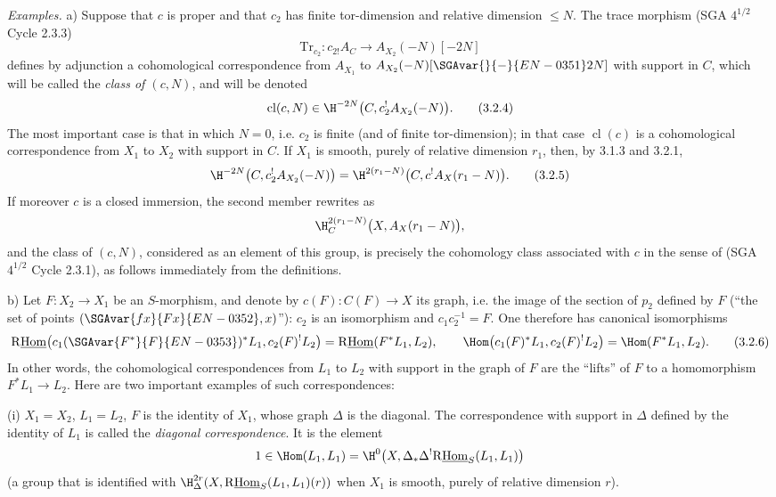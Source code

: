 \emph{Examples.} a) Suppose that $c$ is proper and that $c_2$ has finite tor-dimension and relative dimension $\leq N$. The trace morphism (SGA $4^{1/2}$ Cycle 2.3.3)
\[
\mathrm{Tr}_{c_2}:c_{2!}A_C\longrightarrow A_{X_2}(-N)[-2N]
\]
defines by adjunction a cohomological correspondence from $A_{X_1}$ to $A_{X_2}(-N)[\SGAvar{}{-}{EN-0351}2N]$ with support in $C$, which will be called the \emph{class of $(c,N)$}, and will be denoted
\begin{equation}
\operatorname{cl}(c,N)\in \H^{-2N}\bigl(C,c_2^!A_{X_2}(-N)\bigr).
\tag{3.2.4}
\end{equation}
The most important case is that in which $N=0$, i.e. $c_2$ is finite (and of finite tor-dimension); in that case $\operatorname{cl}(c)$ is a cohomological correspondence from $X_1$ to $X_2$ with support in $C$. If $X_1$ is smooth, purely of relative dimension $r_1$, then, by 3.1.3 and 3.2.1,
\begin{equation}
\H^{-2N}\bigl(C,c_2^!A_{X_2}(-N)\bigr)
=
\H^{2(r_1-N)}\bigl(C,c^!A_X(r_1-N)\bigr).
\tag{3.2.5}
\end{equation}
If moreover $c$ is a closed immersion, the second member rewrites as
\[
\H^{2(r_1-N)}_C\bigl(X,A_X(r_1-N)\bigr),
\]
and the class of $(c,N)$, considered as an element of this group, is precisely the cohomology class associated with $c$ in the sense of (SGA $4^{1/2}$ Cycle 2.3.1), as follows immediately from the definitions.

b) Let $F:X_2\to X_1$ be an $S$-morphism, and denote by $c(F):C(F)\to X$ its graph, i.e. the image of the section of $p_2$ defined by $F$ (``the set of points $(\SGAvar{fx}{Fx}{EN-0352},x)$''): $c_2$ is an isomorphism and $c_1c_2^{-1}=F$. One therefore has canonical isomorphisms
\begin{equation}
\mathrm{R}\underline{\mathrm{Hom}}\bigl(c_1(\SGAvar{F^*}{F}{EN-0353})^*L_1,c_2(F)^!L_2\bigr)=\mathrm{R}\underline{\mathrm{Hom}}(F^*L_1,L_2),
\qquad
\Hom\bigl(c_1(F)^*L_1,c_2(F)^!L_2\bigr)=\Hom(F^*L_1,L_2).
\tag{3.2.6}
\end{equation}
In other words, the cohomological correspondences from $L_1$ to $L_2$ with support in the graph of $F$ are the ``lifts'' of $F$ to a homomorphism $F^*L_1\to L_2$. Here are two important examples of such correspondences:

(i) $X_1=X_2$, $L_1=L_2$, $F$ is the identity of $X_1$, whose graph $\Delta$ is the diagonal. The correspondence with support in $\Delta$ defined by the identity of $L_1$ is called the \emph{diagonal correspondence}. It is the element
\[
1\in \Hom(L_1,L_1)=\H^0\bigl(X,\Delta_*\Delta^!\mathrm{R}\underline{\mathrm{Hom}}_S(L_1,L_1)\bigr)
\]
(a group that is identified with $\H^{2r}_\Delta(X,\mathrm{R}\underline{\mathrm{Hom}}_S(L_1,L_1)(r))$ when $X_1$ is smooth, purely of relative dimension $r$).

